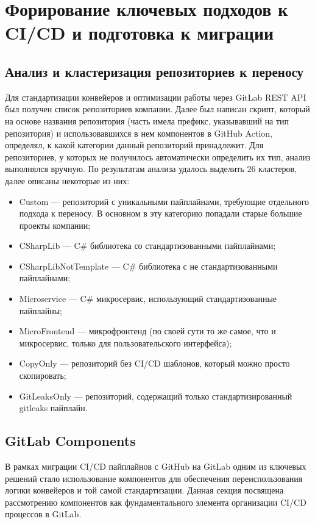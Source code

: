 \chapter{Форирование ключевых подходов к CI/CD и подготовка к миграции} \label{ch:ch2}

\section{Анализ и кластеризация репозиториев к переносу} \label{sec:repository-analysis}
Для стандартизации конвейеров и оптимизации работы через GitLab REST API\cite{gl-rest-api} был получен список репозиториев компании.
Далее был написан скрипт,
который на основе названия репозитория (часть имела префикс, указывавший на тип репозитория) и использовавшихся в нем компонентов в GitHub Action,
определял, к какой категории данный репозиторий принадлежит.
Для репозиториев, у которых не получилось автоматически определить их тип, анализ выполнялся вручную.
По результатам анализа удалось выделить 26 кластеров, далее описаны некоторые из них:
\begin{itemize}
  \item Custom — репозиторий с уникальными пайплайнами, требующие отдельного подхода к переносу.
        В основном в эту категорию попадали старые большие проекты компании;
  \item CSharpLib — C\# библиотека со стандартизованными пайплайнами;
  \item CSharpLibNotTemplate — C\# библиотека с не стандартизованными пайплайнами;
  \item Microservice — C\# микросервис, использующий стандартизованные пайплайны;
  \item MicroFrontend — микрофронтенд (по своей сути то же самое, что и микросервис, только для пользовательского интерфейса);
  \item CopyOnly — репозиторий без CI/CD шаблонов, который можно просто скопировать;
  \item GitLeaksOnly — репозиторий, содержащий только стандартизированный gitleaks пайплайн.
\end{itemize}

\section{GitLab Components} \label{sec:gl-components}
В рамках миграции CI/CD пайплайнов с GitHub на GitLab одним из ключевых решений стало использование компонентов
для обеспечения переиспользования логики конвейеров и той самой стандартизации.
Данная секция посвящена рассмотрению компонентов как фундаментального элемента организации CI/CD процессов в GitLab.


